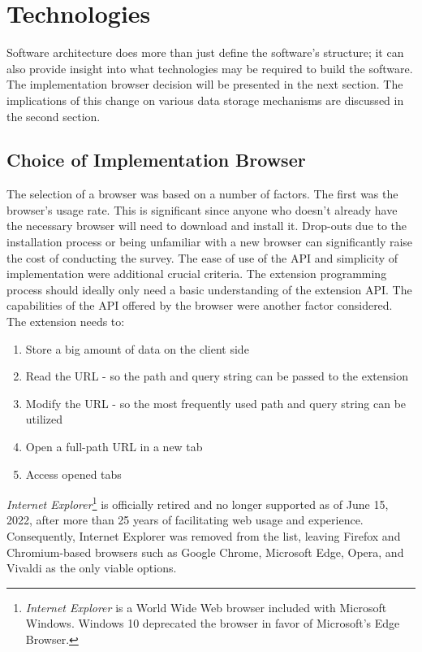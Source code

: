 \section{Technologies}
\label{technologies_used}
Software architecture does more than just define the software's structure; it can also provide insight into what technologies may be required to build the software. The implementation browser decision will be presented in the next section. The implications of this change on various data storage mechanisms are discussed in the second section.

\subsection{Choice of Implementation Browser}
The selection of a browser was based on a number of factors. The first was the browser's usage rate. This is significant since anyone who doesn't already have the necessary browser will need to download and install it. Drop-outs due to the installation process or being unfamiliar with a new browser can significantly raise the cost of conducting the survey. The ease of use of the API and simplicity of implementation were additional crucial criteria. The extension programming process should ideally only need a basic understanding of the extension API. The capabilities of the API offered by the browser were another factor considered. The extension needs to:

\begin{enumerate}
  \item Store a big amount of data on the client side
  \item Read the URL - so the path and query string can be passed to the extension
  \item Modify the URL - so the most frequently used path and query string can be utilized
  \item Open a full-path URL in a new tab
  \item Access opened tabs
\end{enumerate}

\emph{Internet Explorer}\footnote{\emph{Internet Explorer} is a World Wide Web browser included with Microsoft Windows. Windows 10 deprecated the browser in favor of Microsoft's Edge Browser.} is officially retired and no longer supported as of June 15, 2022, after more than 25 years of facilitating web usage and experience. Consequently, Internet Explorer was removed from the list, leaving Firefox and Chromium-based browsers such as Google Chrome, Microsoft Edge, Opera, and Vivaldi as the only viable options.

